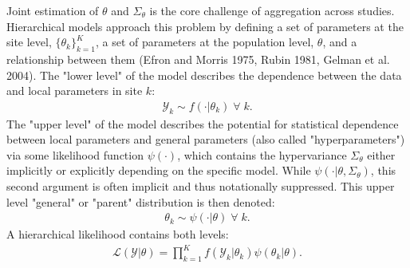 \documentclass[english,12pt]{article}\usepackage{lmodern}
\numberwithin{equation}{section}
\begin{document}
Joint estimation of $\theta$ and $\Sigma_{\theta}$ is the core challenge of aggregation across studies. Hierarchical models approach this problem by defining a set of parameters at the site level, $\{ \theta_k\}_{k=1}^K$, a set of parameters at the population level, $\theta$, and a relationship between them (Efron and Morris 1975, Rubin 1981, Gelman et al. 2004). The "lower level" of the model describes the dependence between the data and local parameters in site $k$:
\begin{equation}
\begin{aligned}
\mathcal{Y}_k \sim f(\cdot | \theta_k) \; \forall \; k.
\end{aligned}
\label{lower level likelihood}
\end{equation}
The "upper level" of the model describes the potential for statistical dependence between local parameters and general parameters (also called "hyperparameters") via some likelihood function $\psi(\cdot)$, which contains the hypervariance $\Sigma_{\theta}$ either implicitly or explicitly depending on the specific model. While $\psi(\cdot | \theta, \Sigma_{\theta})$, this second argument is often implicit and thus notationally suppressed. This upper level "general" or "parent" distribution is then denoted:
\begin{equation}
\begin{aligned}
\theta_k \sim \psi(\cdot | \theta) \; \forall \; k.
\end{aligned}
\label{upper level likelihood}
\end{equation}
A hierarchical likelihood contains both levels: \begin{equation}
\begin{aligned}
\mathcal{L}(\mathcal{Y} | \theta) = \prod_{k=1}^K f(\mathcal{Y}_k | \theta_k)\psi(\theta_k | \theta).
\end{aligned}
\label{hierarchical likelihood}
\end{equation}
\end{document}
